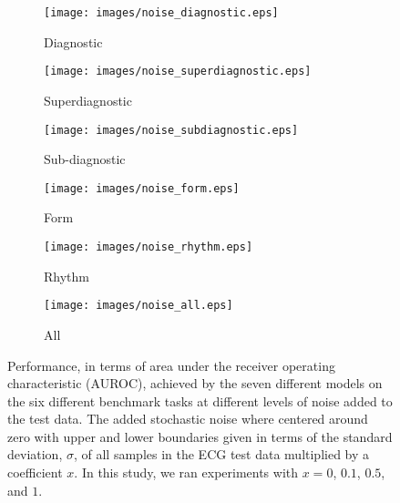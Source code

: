 \begin{figure}[hp]
     \centering
     \begin{subfigure}[b]{0.45\textwidth}
        \texttt{[image: images/noise\_diagnostic.eps]}
        \caption{Diagnostic}
        \label{fig:gridsearch_diag}
     \end{subfigure}
     \hfill
     \begin{subfigure}[b]{0.45\textwidth}
        \texttt{[image: images/noise\_superdiagnostic.eps]}
        \caption{Superdiagnostic}
        \label{fig:gridsearch_superdiag}
     \end{subfigure}
     \hfill
      \begin{subfigure}[b]{0.45\textwidth}
        \texttt{[image: images/noise\_subdiagnostic.eps]}
        \caption{Sub-diagnostic}
        \label{fig:gridsearch_subdiag}
     \end{subfigure}
     \hfill
     \begin{subfigure}[b]{0.45\textwidth}
        \texttt{[image: images/noise\_form.eps]}
        \caption{Form}
        \label{fig:gridsearch_form}
     \end{subfigure}
          \hfill
      \begin{subfigure}[b]{0.45\textwidth}
        \texttt{[image: images/noise\_rhythm.eps]}
        \caption{Rhythm}
        \label{fig:gridsearch_rhythm}
     \end{subfigure}
     \hfill
     \begin{subfigure}[b]{0.45\textwidth}
        \texttt{[image: images/noise\_all.eps]}
        \caption{All}
        \label{fig:gridsearch_all}
     \end{subfigure}
    \caption{Performance, in terms of area under the receiver operating characteristic (AUROC), achieved by the seven different models on the six different benchmark tasks at different levels of noise added to the test data. The added stochastic noise where centered around zero with upper and lower boundaries given in terms of the standard deviation, $\sigma$, of all samples in the ECG test data multiplied by a coefficient $x$. In this study, we ran experiments with $x=0$, $0.1$, $0.5$, and $1$. 
    }
    \label{fig:noise_spaghetti}
\end{figure}
\newpage
 
